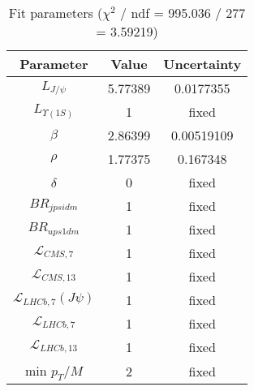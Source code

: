 \begin{table}
\centering
\begin{tabular}{c|c|c}
Parameter & Value & Uncertainty \\
\hline
$L_{J/\psi}$ & 5.77389 & 0.0177355 \\
$L_{\Upsilon(1S)}$ & 1 & fixed \\
$\beta$ & 2.86399 & 0.00519109 \\
$\rho$ & 1.77375 & 0.167348 \\
$\delta$ & 0 & fixed \\
$BR_{jpsidm}$ & 1 & fixed \\
$BR_{ups1dm}$ & 1 & fixed \\
$\mathcal L_{CMS,7}$ & 1 & fixed \\
$\mathcal L_{CMS,13}$ & 1 & fixed \\
$\mathcal L_{LHCb,7}(J\psi)$ & 1 & fixed \\
$\mathcal L_{LHCb,7}$ & 1 & fixed \\
$\mathcal L_{LHCb,13}$ & 1 & fixed \\
min $p_T/M$ & 2 & fixed \\
\end{tabular}
\caption{Fit parameters ($\chi^2$ / ndf = 995.036 / 277 = 3.59219)}
\end{table}
